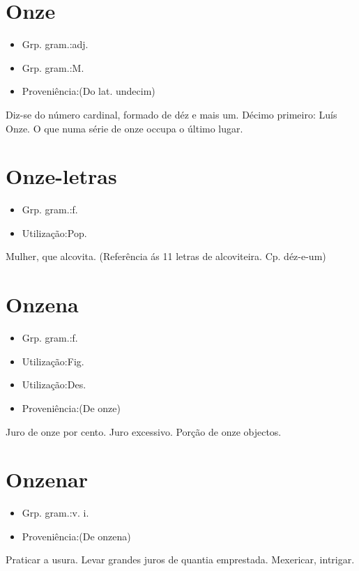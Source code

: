 \section{Onze}
\begin{itemize}
\item {Grp. gram.:adj.}
\end{itemize}
\begin{itemize}
\item {Grp. gram.:M.}
\end{itemize}
\begin{itemize}
\item {Proveniência:(Do lat. \textunderscore undecim\textunderscore )}
\end{itemize}
Diz-se do número cardinal, formado de déz e mais um.
Décimo primeiro: \textunderscore Luís Onze\textunderscore .
O que numa série de onze occupa o último lugar.
\section{Onze-letras}
\begin{itemize}
\item {Grp. gram.:f.}
\end{itemize}
\begin{itemize}
\item {Utilização:Pop.}
\end{itemize}
Mulher, que alcovita.
(Referência ás 11 letras de \textunderscore alcoviteira\textunderscore . Cp. \textunderscore déz-e-um\textunderscore )
\section{Onzena}
\begin{itemize}
\item {Grp. gram.:f.}
\end{itemize}
\begin{itemize}
\item {Utilização:Fig.}
\end{itemize}
\begin{itemize}
\item {Utilização:Des.}
\end{itemize}
\begin{itemize}
\item {Proveniência:(De \textunderscore onze\textunderscore )}
\end{itemize}
Juro de onze por cento.
Juro excessivo.
Porção de onze objectos.
\section{Onzenar}
\begin{itemize}
\item {Grp. gram.:v. i.}
\end{itemize}
\begin{itemize}
\item {Proveniência:(De \textunderscore onzena\textunderscore )}
\end{itemize}
Praticar a usura.
Levar grandes juros de quantia emprestada.
Mexericar, intrigar.
